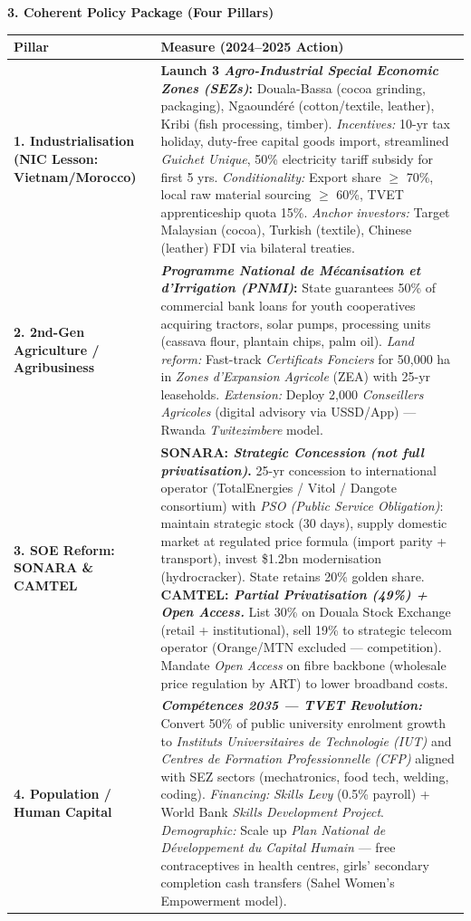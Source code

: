 \documentclass[11pt]{article}
\begin{document}
\begin{exemplebox}
\textbf{3. Coherent Policy Package (Four Pillars)}
\begin{center}
\begin{tabularx}{\linewidth}{|l|X|}\hline
\rowcolor{popblueL}
\textbf{Pillar} & \textbf{Measure (2024--2025 Action)} \\ \hline
\textbf{1. Industrialisation (NIC Lesson: Vietnam/Morocco)} & \textbf{Launch 3 \emph{Agro-Industrial Special Economic Zones (SEZs)}:} Douala-Bassa (cocoa grinding, packaging), Ngaoundéré (cotton/textile, leather), Kribi (fish processing, timber). \emph{Incentives:} 10-yr tax holiday, duty-free capital goods import, streamlined \emph{Guichet Unique}, 50\% electricity tariff subsidy for first 5 yrs. \emph{Conditionality:} Export share $\ge$ 70\%, local raw material sourcing $\ge$ 60\%, TVET apprenticeship quota 15\%. \emph{Anchor investors:} Target Malaysian (cocoa), Turkish (textile), Chinese (leather) FDI via bilateral treaties. \\ \hline
\textbf{2. 2nd-Gen Agriculture / Agribusiness} & \textbf{\emph{Programme National de Mécanisation et d'Irrigation (PNMI)}:} State guarantees 50\% of commercial bank loans for youth cooperatives acquiring tractors, solar pumps, processing units (cassava flour, plantain chips, palm oil). \emph{Land reform:} Fast-track \emph{Certificats Fonciers} for 50,000 ha in \emph{Zones d'Expansion Agricole} (ZEA) with 25-yr leaseholds. \emph{Extension:} Deploy 2,000 \emph{Conseillers Agricoles} (digital advisory via USSD/App) — Rwanda \emph{Twitezimbere} model. \\ \hline
\textbf{3. SOE Reform: SONARA \& CAMTEL} & \textbf{SONARA: \emph{Strategic Concession (not full privatisation)}.} 25-yr concession to international operator (TotalEnergies / Vitol / Dangote consortium) with \emph{PSO (Public Service Obligation)}: maintain strategic stock (30 days), supply domestic market at regulated price formula (import parity + transport), invest \$1.2bn modernisation (hydrocracker). State retains 20\% golden share. \textbf{CAMTEL: \emph{Partial Privatisation (49\%) + Open Access.}} List 30\% on Douala Stock Exchange (retail + institutional), sell 19\% to strategic telecom operator (Orange/MTN excluded — competition). Mandate \emph{Open Access} on fibre backbone (wholesale price regulation by ART) to lower broadband costs. \\ \hline
\textbf{4. Population / Human Capital} & \textbf{\emph{Compétences 2035 — TVET Revolution:}} Convert 50\% of public university enrolment growth to \emph{Instituts Universitaires de Technologie (IUT)} and \emph{Centres de Formation Professionnelle (CFP)} aligned with SEZ sectors (mechatronics, food tech, welding, coding). \emph{Financing:} \emph{Skills Levy} (0.5\% payroll) + World Bank \emph{Skills Development Project}. \emph{Demographic:} Scale up \emph{Plan National de Développement du Capital Humain} — free contraceptives in health centres, girls' secondary completion cash transfers (Sahel Women's Empowerment model). \\ \hline
\end{tabularx}
\end{center}


\end{exemplebox}
\end{document}
